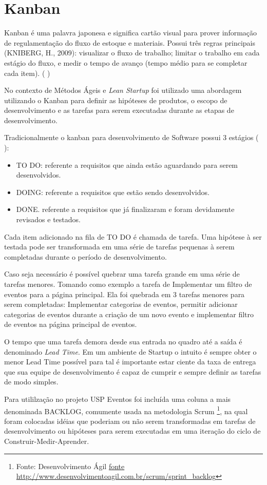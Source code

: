 \section{Kanban}
\par Kanban é uma palavra japonesa e significa cartão visual para prover informação de regulamentação do fluxo de estoque e materiais. Possui três regras principais (KNIBERG, H., 2009): visualizar o fluxo de trabalho; limitar o trabalho em cada estágio do fluxo, e medir o tempo de avanço (tempo médio para se completar cada item). ( \cite{francisco:14})
\par No contexto de Métodos Ágeis e \emph{Lean Startup} foi utilizado uma abordagem utilizando o Kanban para definir as hipóteses de produtos, o escopo de desenvolvimento e as tarefas para serem executadas durante as etapas de desenvolvimento.
\par Tradicionalmente o kanban para desenvolvimento de Software possui 3 estágios ( \cite{francisco:14}):
\begin{itemize}
        \item TO DO: referente a requisitos que ainda estão aguardando para serem
desenvolvidos.
        \item DOING: referente a requisitos que estão sendo desenvolvidos.
        \item DONE. referente a requisitos que já finalizaram e foram devidamente
revisados e testados.
\end{itemize}
\par Cada item adicionado na fila de TO DO é chamada de tarefa. Uma hipótese à ser testada pode ser transformada em uma série de tarefas pequenas à serem completadas durante o período de desenvolvimento.
\par Caso seja necessário é possível quebrar uma tarefa grande em uma série de tarefas menores. Tomando como exemplo a tarefa de Implementar um filtro de eventos para a página principal. Ela foi quebrada em 3 tarefas menores para serem completadas: Implementar categorias de eventos, permitir adicionar categorias de eventos durante a criação de um novo evento e implementar filtro de eventos na página principal de eventos.
\par O tempo que uma tarefa demora desde sua entrada no quadro até a saída é denominado \emph{Lead Time}. Em um ambiente de Startup o intuito é sempre obter o menor Lead Time possível para tal é importante estar ciente da taxa de entrega que sua equipe de desenvolvimento é capaz de cumprir e sempre definir as tarefas de modo simples.
\par Para utililzação no projeto USP Eventos foi incluída uma coluna a mais denominada BACKLOG, comumente usada na metodologia Scrum \footnote{Fonte: Desenvolvimento Ágil \url{fonte http://www.desenvolvimentoagil.com.br/scrum/sprint_backlog}}, na qual foram colocadas idéias que poderiam ou não serem transformadas em tarefas de desenvolvimento ou hipóteses para serem executadas em uma iteração do ciclo de Construir-Medir-Aprender.
